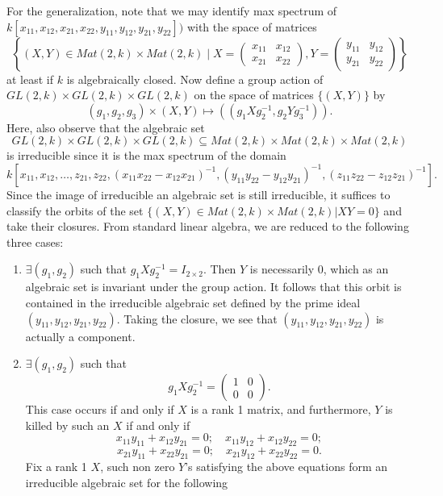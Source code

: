 \begin{example}
\medskip\noindent
For the generalization, note that we may identify max spectrum of
$k[x_{11}, x_{12}, x_{21}, x_{22}, y_{11}, y_{12}, y_{21}, y_{22}])$
with the space of matrices
$$
\left\{ (X, Y) \in Mat(2, k)\times Mat(2, k) \mid
X = \left(
\begin{matrix}
x_{11} & x_{12}\\
x_{21} & x_{22}
\end{matrix}
\right),
Y= \left(
\begin{matrix}
y_{11} & y_{12}\\
y_{21} & y_{22}
\end{matrix}
\right)
\right\}
$$
at least if $k$ is algebraically closed.
Now define a group action of
$GL(2, k)\times GL(2, k)\times GL(2, k)$ on the space of matrices
$\{(X, Y)\}$ by
$$
(g_1, g_2, g_3) \times (X, Y) \mapsto ((g_1Xg_2^{-1}, g_2Yg_3^{-1})).
$$
Here, also observe that the algebraic set
$$
GL(2, k)\times GL(2, k)\times GL(2, k) \subseteq
Mat(2, k)\times Mat(2, k) \times Mat(2, k)
$$
is irreducible since it is the max spectrum of the domain
$$
k[x_{11}, x_{12}, \ldots, z_{21}, z_{22}, (x_{11}x_{22}-x_{12}x_{21})^{-1}
, (y_{11}y_{22}-y_{12}y_{21})^{-1}, (z_{11}z_{22}-z_{12}z_{21})^{-1}].
$$
Since the image of irreducible an algebraic set is still
irreducible, it suffices to classify the orbits of the set
$\{(X, Y)\in Mat(2, k)\times Mat(2, k)|XY = 0\}$ and take their
closures. From standard linear algebra, we are reduced to the
following three cases:
\begin{enumerate}
\item $\exists (g_1, g_2)$ such that $g_1Xg_2^{-1} = I_{2\times 2}$.
Then $Y$ is necessarily $0$, which as an algebraic set is
invariant under the group action. It follows that this orbit is
contained in the irreducible algebraic set defined by the prime
ideal $(y_{11}, y_{12}, y_{21}, y_{22})$. Taking the closure, we see
that $(y_{11}, y_{12}, y_{21}, y_{22})$ is actually a component.
\item $\exists (g_1, g_2)$ such that
$$
g_1Xg_2^{-1} = \left(
\begin{matrix}
1 & 0 \\
0 & 0
\end{matrix}
\right).
$$
This case occurs if and only if $X$ is a rank 1 matrix,
and furthermore, $Y$ is killed by such an $X$ if and only if
$$
x_{11}y_{11}+x_{12}y_{21} = 0; \quad x_{11}y_{12}+x_{12}y_{22} = 0;
$$
$$
x_{21}y_{11}+x_{22}y_{21} = 0; \quad x_{21}y_{12}+x_{22}y_{22} = 0.
$$
Fix a rank 1 $X$, such non zero $Y$'s satisfying the above
equations form an irreducible algebraic set for the following

\end{enumerate}
\end{example}

